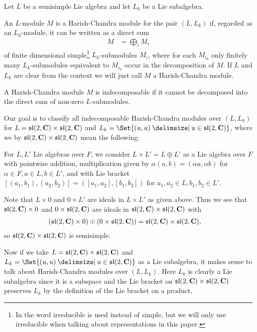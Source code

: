 Let $L$ be a semisimple Lie algebra and let $L_k$ be a Lie subalgebra.
\begin{definition}\label{def:HarishChandra}
  An $L$-module $M$ is a Harish-Chandra module for the pair $(L,L_k)$ if, regarded as an $L_k$-module, it can be written as a direct sum
  \begin{align*}
    M &= \bigoplus_{i} M_i
  \end{align*}
  of finite dimensional simple\footnote{In \cite{indecompReprOfLorGr} the word irreducible is used instead of simple, but we will only use irreducible when talking about representations in this paper.} $L_k$-submodules $M_i$, where for each $M_{i_0}$ only finitely many $L_k$-submodules equivalent to $M_{i_0}$ occur in the decomposition of $M$. If $L$ and $L_k$ are clear from the context we will just call $M$ a Harish-Chandra module.

  A Harish-Chandra module $M$ is indecomposable if it cannot be decomposed into the direct sum of non-zero $L$-submodules.
\end{definition}

Our goal is to classify all indecomposable Harish-Chandra modules over $(L,L_k)$ for $L=\mathfrak{sl}(2,\mathbf{C})\times \mathfrak{sl}(2,\mathbf{C})$ and $L_k=\Set{(u,u)\given u\in\slc}$, where we by $\mathfrak{sl}(2,\mathbf{C})\times \mathfrak{sl}(2,\mathbf{C})$ mean the following:

For $L,L'$ Lie algebras over $F$, we consider $L\times L'=L\oplus L'$ as a Lie algebra over $F$ with pointwise addition, multiplication given by $\alpha(a,b)=(\alpha a,\alpha b)$ for $\alpha\in F,a\in L,b\in L'$, and with Lie bracket $[(a_1,b_1),(a_2,b_2)]=([a_1,a_2],[b_1,b_2])$ for $a_1,a_2\in L,b_1,b_2\in L'$.

\begin{remark}
  Note that $L\times 0$ and $0\times L'$ are ideals in $L\times L'$ as given above. Thus we see that $\mathfrak{sl}(2,\mathbf{C})\times 0$ and $0\times \mathfrak{sl}(2,\mathbf{C})$ are ideals in $\mathfrak{sl}(2,\mathbf{C})\times \mathfrak{sl}(2,\mathbf{C})$ with
  \begin{align*}
    (\mathfrak{sl}(2,\mathbf{C})\times 0) \oplus (0\times\mathfrak{sl}(2,\mathbf{C})) &= \mathfrak{sl}(2,\mathbf{C})\times \mathfrak{sl}(2,\mathbf{C}),
  \end{align*}
  so $\mathfrak{sl}(2,\mathbf{C})\times \mathfrak{sl}(2,\mathbf{C})$ is semisimple. 

  Now if we take $L=\mathfrak{sl}(2,\mathbf{C})\times \mathfrak{sl}(2,\mathbf{C})$ and $L_k=\Set{(u,u)\given u\in\slc}$ as a Lie subalgebra, it makes sense to talk about Harish-Chandra modules over $(L,L_k)$. Here $L_k$ is clearly a Lie subalgebra since it is a subspace and the Lie bracket on $\mathfrak{sl}(2,\mathbf{C})\times \mathfrak{sl}(2,\mathbf{C})$ preserves $L_k$ by the definition of the Lie bracket on a product. 
\end{remark}

